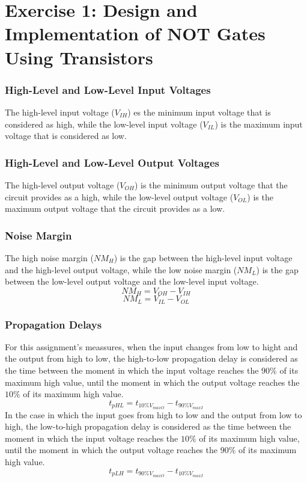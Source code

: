 \documentclass[a4paper,11pt]{report}
\begin{document}
\section{\color{olive}Exercise 1: Design and Implementation of NOT Gates Using Transistors} %


\subsubsection{\color{red}High-Level and Low-Level Input Voltages}
The high-level input voltage ($V_{IH}$) es the minimum input voltage that is considered as high, while the low-level input voltage ($V_{IL}$)  is the maximum input voltage that is considered as low.

\subsubsection{\color{red}High-Level and Low-Level Output Voltages}
The high-level output voltage ($V_{OH}$) is the minimum output voltage that the circuit provides as a high, while the low-level output voltage ($V_{OL}$) is the maximum output voltage that the circuit provides as a low.

\subsubsection{\color{red}Noise Margin}
The high noise margin ($NM_{H}$) is the gap between the high-level input voltage and the high-level output voltage, while the low noise margin ($NM_{L}$) is the gap between the low-level output voltage and the low-level input voltage.
$$NM_{H} = V_{OH} - V_{IH}$$
$$NM_{L} = V_{IL} - V_{OL}$$

\subsubsection{\color{red}Propagation Delays}
For this assignment's meassures, when the input changes from low to hight and the output from high to low, the high-to-low propagation delay is considered as the time between the moment in which the input voltage reaches the $90\% $ of its maximum high value, until the moment in which the output voltage reaches the $10\%$ of its maximum high value.
$$t_{pHL} = t_{10\%V_{maxO}} - t_{90\%V_{maxI}}$$
In the case in which the input goes from high to low and the output from low to high, the low-to-high propagation delay is considered as the time between the moment in which the input voltage reaches the $10\%$ of its maximum high value, until the moment in which the output voltage reaches the $90\%$ of its maximum high value.
$$t_{pLH} = t_{90\%V_{maxO}} - t_{10\%V_{maxI}}$$
\end{document}
